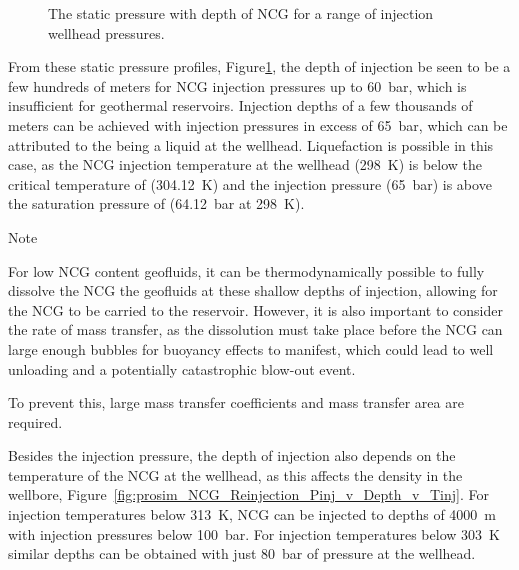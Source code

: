         \begin{figure}[H]
            \centering
            
            \caption{The static pressure with depth of \ac{NCG} for a range of injection wellhead pressures.}
            \label{fig:prosim_NCG_Reinjection_PvD_by_Pinj}
        \end{figure}

        From these static pressure profiles, Figure\ref{fig:prosim_NCG_Reinjection_PvD_by_Pinj}, the depth of injection be seen to be a few hundreds of meters for \ac{NCG} injection pressures up to \qty{60}{\bar}, which is insufficient for geothermal reservoirs. Injection depths of a few thousands of meters can be achieved with injection pressures in excess of \qty{65}{\bar}, which can be attributed to the  being a liquid at the wellhead. Liquefaction is possible in this case, as the \ac{NCG} injection temperature at the wellhead (\qty{298}{\K}) is below the critical temperature of  (\qty{304.12}{\K}) and the injection pressure (\qty{65}{\bar}) is above the saturation pressure of  (\qty{64.12}{\bar} at \qty{298}{\K}).   

        \begin{notes}{Note}

            For low \ac{NCG} content geofluids, it can be thermodynamically possible to fully dissolve the \ac{NCG} the geofluids at these shallow depths of injection, allowing for the \ac{NCG} to be carried to the reservoir. However, it is also important to consider the rate of mass transfer, as the dissolution must take place before the \ac{NCG} can large enough bubbles for buoyancy effects to manifest, which could lead to well unloading and a potentially catastrophic blow-out event.

            To prevent this, large mass transfer coefficients and mass transfer area are required. 
        \end{notes}

        Besides the injection pressure, the depth of injection also depends on the temperature of the \ac{NCG} at the wellhead, as this affects the density in the wellbore, Figure~\ref{fig:prosim_NCG_Reinjection_Pinj_v_Depth_v_Tinj}. For injection temperatures below \qty{313}{\K}, \ac{NCG} can be injected to depths of \qty{4000}{m} with injection pressures below \qty{100}{\bar}. For injection temperatures below \qty{303}{\K} similar depths can be obtained with just \qty{80}{\bar} of pressure at the wellhead.

